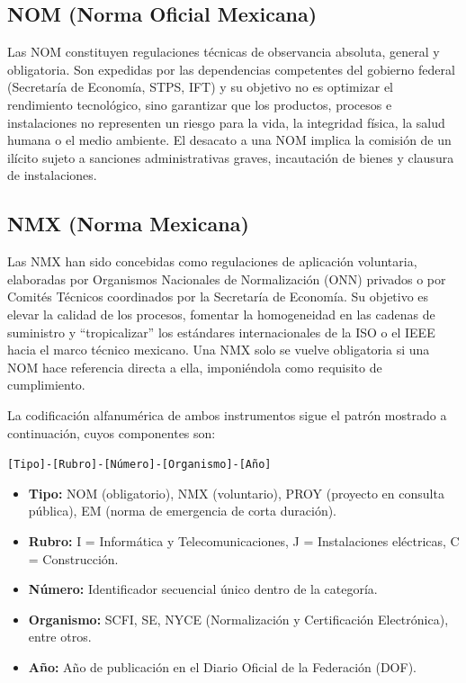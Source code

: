 \documentclass[a4paper,12pt]{article}
\begin{document}
\subsection*{NOM (Norma Oficial Mexicana)}

Las NOM constituyen regulaciones técnicas de observancia absoluta, general y obligatoria. Son expedidas por las dependencias competentes del gobierno federal (Secretaría de Economía, STPS, IFT) y su objetivo no es optimizar el rendimiento tecnológico, sino garantizar que los productos, procesos e instalaciones no representen un riesgo para la vida, la integridad física, la salud humana o el medio ambiente. El desacato a una NOM implica la comisión de un ilícito sujeto a sanciones administrativas graves, incautación de bienes y clausura de instalaciones.

\subsection*{NMX (Norma Mexicana)}

Las NMX han sido concebidas como regulaciones de aplicación voluntaria, elaboradas por Organismos Nacionales de Normalización (ONN) privados o por Comités Técnicos coordinados por la Secretaría de Economía. Su objetivo es elevar la calidad de los procesos, fomentar la homogeneidad en las cadenas de suministro y ``tropicalizar'' los estándares internacionales de la ISO o el IEEE hacia el marco técnico mexicano. Una NMX solo se vuelve obligatoria si una NOM hace referencia directa a ella, imponiéndola como requisito de cumplimiento.

La codificación alfanumérica de ambos instrumentos sigue el patrón mostrado a continuación, cuyos componentes son:

\begin{center}
\texttt{[Tipo]-[Rubro]-[Número]-[Organismo]-[Año]}
\end{center}

\begin{itemize}
    \item \textbf{Tipo:} NOM (obligatorio), NMX (voluntario), PROY (proyecto en consulta pública), EM (norma de emergencia de corta duración).
    \item \textbf{Rubro:} I = Informática y Telecomunicaciones, J = Instalaciones eléctricas, C = Construcción.
    \item \textbf{Número:} Identificador secuencial único dentro de la categoría.
    \item \textbf{Organismo:} SCFI, SE, NYCE (Normalización y Certificación Electrónica), entre otros.
    \item \textbf{Año:} Año de publicación en el Diario Oficial de la Federación (DOF).
\end{itemize}
\end{document}
